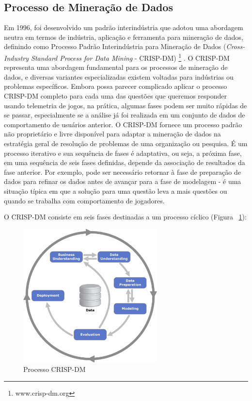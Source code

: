 \subsection{Processo de Mineração de Dados}
Em 1996, foi desenvolvido um padrão interindústria que adotou uma abordagem neutra em termos de indústria, aplicação e ferramenta para mineração de dados, definindo como Processo Padrão Interindústria para Mineração de Dados (\textit{Cross-Industry Standard Process for Data Mining} - CRISP-DM) \footnote{www.crisp-dm.org} \cite{el2016game}. O CRISP-DM representa uma abordagem fundamental para os processos de mineração de dados, e diversas variantes especializadas existem voltadas para indústrias ou problemas específicos. Embora possa parecer complicado aplicar o processo CRISP-DM completo para cada uma das questões que queremos responder usando telemetria de jogos, na prática, algumas fases podem ser muito rápidas de se passar, especialmente se a análise já foi realizada em um conjunto de dados de comportamento de usuários anterior. O CRISP-DM fornece um processo padrão não proprietário e livre disponível para adaptar a mineração de dados na estratégia geral de resolução de problemas de uma organização ou pesquisa. É um processo iterativo e sua sequência de fases é adaptativa, ou seja, a próxima fase, em uma sequência de seis fases definidas, depende da associação de resultados da fase anterior. Por exemplo, pode ser necessário retornar à fase de preparação de dados para refinar os dados antes de avançar para a fase de modelagem - é uma situação típica em que a solução para uma questão leva a mais questões ou quando se trabalha com comportamento de jogadores.

O CRISP-DM consiste em seis fases destinadas a um processo cíclico (Figura ~\ref{fig:crisp-dm}):

\begin{figure}
  \centering
  \includegraphics[width=0.65\textwidth]{crisp-dm}%
  \caption{Processo CRISP-DM}
  \label{fig:crisp-dm}
\end{figure}

